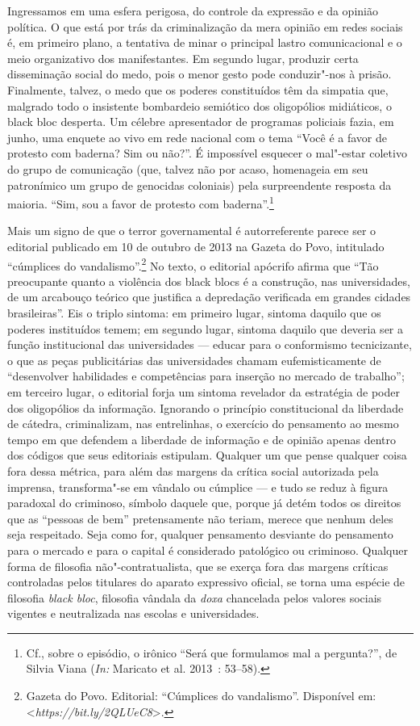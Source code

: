 Ingressamos em uma esfera perigosa, do controle da expressão e da
opinião política. O que está por trás da criminalização da mera opinião
em redes sociais é, em primeiro plano, a tentativa de minar o principal
lastro comunicacional e o meio organizativo dos manifestantes. Em
segundo lugar, produzir certa disseminação social do medo, pois o menor
gesto pode conduzir"-nos à prisão. Finalmente, talvez, o medo que os
poderes constituídos têm da simpatia que, malgrado todo o insistente
bombardeio semiótico dos oligopólios midiáticos, o black bloc desperta.
Um célebre apresentador de programas policiais fazia, em junho, uma
enquete ao vivo em rede nacional com o tema ``Você é a favor de protesto
com baderna? Sim ou não?''. É impossível esquecer o mal"-estar coletivo
do grupo de comunicação (que, talvez não por acaso, homenageia em seu
patronímico um grupo de genocidas coloniais) pela surpreendente resposta
da maioria. ``Sim, sou a favor de protesto com
baderna''.\footnote{Cf., sobre o episódio, o irônico
  ``Será que formulamos mal a pergunta?'', de Silvia Viana (\emph{In:}
  Maricato et al. 2013~: 53--58).}

Mais um signo de que o terror governamental é autorreferente parece ser
o editorial publicado em 10 de outubro de 2013 na Gazeta do Povo,
intitulado ``cúmplices do vandalismo''.\footnote{Gazeta
  do Povo. Editorial: ``Cúmplices do vandalismo''. Disponível em:
  \textless{}\emph{https://bit.ly/2QLUeC8}\textgreater{}.}
No texto, o editorial apócrifo afirma que ``Tão preocupante quanto a
violência dos black blocs é a construção, nas universidades, de um
arcabouço teórico que justifica a depredação verificada em grandes
cidades brasileiras''. Eis o triplo sintoma: em primeiro lugar, sintoma
daquilo que os poderes instituídos temem; em segundo lugar, sintoma
daquilo que deveria ser a função institucional das universidades ---
educar para o conformismo tecnicizante, o que as peças publicitárias das
universidades chamam eufemisticamente de ``desenvolver habilidades e
competências para inserção no mercado de trabalho''; em terceiro lugar,
o editorial forja um sintoma revelador da estratégia de poder dos
oligopólios da informação. Ignorando o princípio constitucional da
liberdade de cátedra, criminalizam, nas entrelinhas, o exercício do
pensamento ao mesmo tempo em que defendem a liberdade de informação e de
opinião apenas dentro dos códigos que seus editoriais estipulam.
Qualquer um que pense qualquer coisa fora dessa métrica, para além das
margens da crítica social autorizada pela imprensa, transforma"-se em
vândalo ou cúmplice --- e tudo se reduz à figura paradoxal do criminoso,
símbolo daquele que, porque já detém todos os direitos que as ``pessoas
de bem'' pretensamente não teriam, merece que nenhum deles seja
respeitado. Seja como for, qualquer pensamento desviante do pensamento
para o mercado e para o capital é considerado patológico ou criminoso.
Qualquer forma de filosofia não"-contratualista, que se exerça fora das
margens críticas controladas pelos titulares do aparato expressivo
oficial, se torna uma espécie de filosofia \emph{black bloc}, filosofia
vândala da \emph{doxa }chancelada pelos valores sociais vigentes e
neutralizada nas escolas e universidades.

